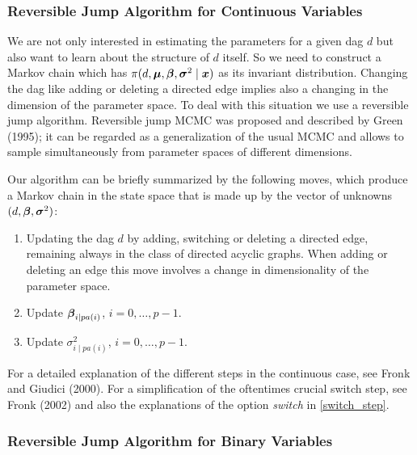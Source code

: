 \subsubsection*{Reversible Jump Algorithm for Continuous Variables}

We are not only interested in estimating the parameters for a
given dag $d$ but also want to learn about the structure of $d$
itself. So we need to construct a Markov chain which has $
\pi(d,\mbox{\boldmath $\mu$}, \mbox{\boldmath $\beta$}, \mbox{\boldmath $\sigma$}^2\mid \mbox{\boldmath $x$})$ as its invariant
distribution. Changing the dag like adding or deleting a directed
edge implies also a changing in the dimension of the parameter
space. To deal with this situation we use a reversible jump
algorithm. Reversible jump MCMC was proposed and described by
Green (1995); it can be regarded as a generalization of the usual
MCMC and allows to sample simultaneously from parameter spaces of
different dimensions.

Our algorithm can be briefly summarized by the following moves,
which produce a Markov chain in the state space that is made up by
the vector of unknowns $(d,\mbox{\boldmath $\beta$},\mbox{\boldmath $\sigma$}^2)$:
%
\begin{enumerate}
\item Updating the dag $d$ by adding, switching or deleting a
directed edge, remaining always in the class of directed acyclic
graphs. When adding or deleting an edge this move involves a
change in dimensionality of the parameter space.
\item Update  $\mbox{\boldmath $\beta$}_{i\mid pa(i)}$, $i=0, \dots, p-1$.
\item Update $\sigma^2_{i\mid pa(i)}$, $i=0, \dots, p-1$.
\end{enumerate}
%
For a detailed explanation of the different steps in the
continuous case, see Fronk and Giudici (2000). For a
simplification of the oftentimes crucial switch step, see Fronk
(2002) and also the explanations of the option {\it switch} in
\autoref{switch_step}.

\newpage

\subsubsection*{Reversible Jump Algorithm for Binary Variables}

